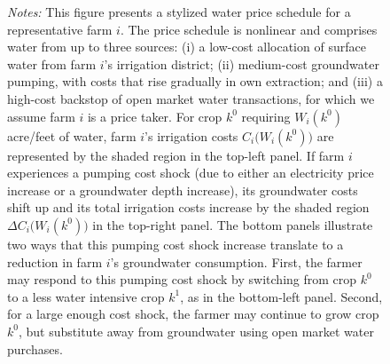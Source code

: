 \begin{figure}[t]
\begin{centering}
\caption*{\scriptsize \emph{Notes:} This figure presents a stylized water price schedule for a representative farm $i$. The price schedule is nonlinear and comprises water from up to three sources: (i) a low-cost allocation of surface water from farm $i$'s irrigation district; (ii) medium-cost groundwater pumping, with costs that rise gradually in own extraction; and (iii) a high-cost backstop of open market water transactions, for which we assume farm $i$ is a price taker. For crop $k^0$ requiring $W_i(k^0)$ acre/feet of water, farm $i$'s irrigation costs $C_i\big(W_i(k^0)\big)$ are represented by the shaded region in the top-left panel. If farm $i$ experiences a pumping cost shock (due to either an electricity price increase or a groundwater depth increase), its groundwater costs shift up and its total irrigation costs increase by the shaded region $\Delta C_i\big(W_i(k^0)\big)$ in the top-right panel. The bottom panels illustrate two ways that this pumping cost shock increase translate to a reduction in farm $i$'s groundwater consumption. First, the farmer may respond to this pumping cost shock by switching from crop $k^0$ to a less water intensive crop $k^1$, as in the bottom-left panel. Second, for a large enough cost shock, the farmer may continue to grow crop $k^0$, but substitute away from groundwater using open market water purchases.
}
\end{centering}
\end{figure}